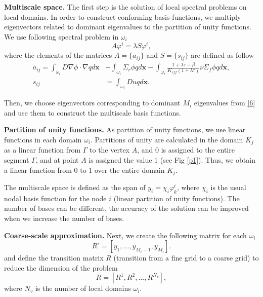 \documentclass[runningheads]{llncs}
\begin{document}
\textbf{Multiscale space.}
The first step is the solution of local spectral problems on local domains.  
In order to construct conforming basis functions, we multiply eigenvectors related to dominant eigenvalues to the partition of unity functions.
We use following spectral problem in $\omega_i$
\begin{equation} \label{6}
A \varphi^i = \lambda S \varphi^i,
\end{equation} 
where the elements of the matrices $A= \{ a_{ij} \}$ and $S = \{ s_{ij} \}$ are defined as follow{
\begin{equation} \label{7}
\begin{split}
a_{ij} = 
\int_{\omega_i} D \nabla\phi \cdot \nabla q d\bm x &+ 
\int_{\omega_i} \Sigma_r \phi q d\bm x - 
\int_{\omega_i} \frac{1+\lambda\tau-\beta}{K_{eff}(1+\lambda\tau)} \nu \Sigma_f \phi q d\bm x, \\
s_{ij} &= \int_{\omega _i} D u q d\bm x.
\end{split}
\end{equation}}

{Then, we choose eigenvectors corresponding to dominant $M_{i}$ eigenvalues from \eqref{6} and use them to construct the multiscale basis functions.} 

\textbf{Partition of unity functions. } As  partition of unity functions, we use linear functions in each domain $\omega_i$.
Partitions of unity are calculated in the domain $ K_j $ as a linear function from $\Gamma$ to the vertex $ A $, and $ 0 $ is assigned to the entire segment $\Gamma$, and at point $ A $ is assigned the value $1$ (see Fig \ref{p1}). 
Thus, we obtain a linear function from $ 0 $ to $ 1 $ over the entire domain $ K_j $. 
%
 
The multiscale space is defined as the span of $y_i = \chi_i \varphi^i_k$, where $\chi_i$ is the usual nodal basis function for the node $i$ (linear partition of unity functions). 
The number of bases can be different, the accuracy of the solution can be improved when we increase the number of bases.

\textbf{Coarse-scale approximation. }
Next, we create the following  matrix for each $\omega_i$
\[
R^i = \left[ y_1, \ldots, y_{M_i-1},  y_{M_i} \right].
\]
and define the transition matrix $R$ (transition from a fine grid to a coarse grid) to reduce the dimension of the problem
\[
R = [ R^1, R^2, ..., R^{N_v} ],
\]
where $N_v$ is the number of local domains $\omega_i$.
\end{document}
